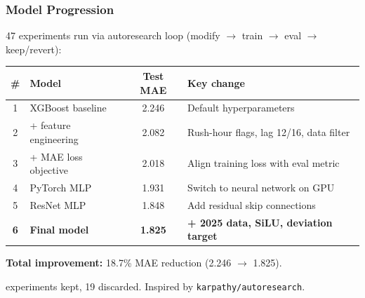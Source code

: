 \documentclass{beamer}
\begin{document}
\begin{frame}
\frametitle{Model Progression}

47 experiments run via autoresearch loop (modify $\rightarrow$ train $\rightarrow$ eval $\rightarrow$ keep/revert):

\bigskip
\centering
{\small
\begin{tabular}{@{}clcl@{}}
\toprule
\textbf{\#} & \textbf{Model} & \textbf{Test MAE} & \textbf{Key change} \\
\midrule
1 & XGBoost baseline     & 2.246 & Default hyperparameters \\
2 & + feature engineering & 2.082 & Rush-hour flags, lag 12/16, data filter \\
3 & + MAE loss objective  & 2.018 & Align training loss with eval metric \\
4 & PyTorch MLP           & 1.931 & Switch to neural network on GPU \\
5 & ResNet MLP            & 1.848 & Add residual skip connections \\
\textbf{6} & \textbf{Final model} & \textbf{1.825} & \textbf{+ 2025 data, SiLU, deviation target} \\
\bottomrule
\end{tabular}
}

\bigskip
\flushleft
\textbf{Total improvement:} 18.7\% MAE reduction (2.246 $\rightarrow$ 1.825).

 experiments kept, 19 discarded. Inspired by \texttt{karpathy/autoresearch}.
\end{frame}
\end{document}
